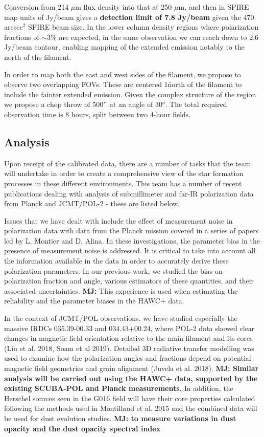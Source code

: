 \documentclass[11pt]{amsart}
\begin{document}
{Conversion from 214 $\mu$m flux density into that at 250 $\mu$m, and then in SPIRE map units of Jy/beam gives a {\bf detection limit of 7.8 Jy/beam}
given the 470 arcsec$^2$ SPIRE beam size.  In the lower column density regions where polarization fractions of $\sim3\%$ are expected, in the same
observation we can reach down to 2.6 Jy/beam contour, enabling mapping of the extended emission notably to the north of the filament.

In order to map both the east and west sides of the filament, we propose to observe two overlapping FOVs. These are centered 1\' north of the filament to include
the fainter extended emission. Given the complex structure of the region we propose a chop throw of 500$"$ at an angle of 30$^o$. 
The total required observation time is 8 hours, split between two 4-hour fields.


\subsection{Analysis}
Upon receipt of the calibrated data, there are a number of tasks that the team will undertake in order
to create a comprehensive view of the star formation processes in these different environments. This team has a number of recent publications dealing with analysis of submillimeter and far-IR polarization data from Planck and JCMT/POL-2 - these are listed below.

Issues that we have dealt with include the effect of measurement noise in polarization data with data from the Planck mission covered in a series of papers led by L. Montier and D. Alina.
In these investigations, the parameter bias in the presence of measurement noise is addressed. It is critical to take into account all the information available in the data in order to accurately derive these polarization parameters.  In our previous work, we studied the bias on polarization fraction and angle, various estimators of these quantities, and their associated uncertainties. {\bf MJ: }This experience is used when estimating the reliability and the parameter biases in the HAWC+ data.}

In the context of JCMT/POL observations, we have studied especially the massive IRDCs 035.39-00.33 and 034.43+00.24, where POL-2 data showed clear changes in magnetic field orientation relative to the main filament and its cores  (Liu et al. 2018, Soam et al 2019). 
Detailed 3D radiative transfer modelling was used to examine  how the polarization angles and fractions depend on potential magnetic field geometries and grain alignment (Juvela et al. 2018).
{\bf MJ: Similar analysis will be carried out using the HAWC+ data, supported by the existing SCUBA-POL and Planck measurements.}
In addition, the Herschel sources seen in the G016 field will have their core properties calculated following the methods used in Montillaud et al. 2015 and the combined data will be used for dust evolution studies.
{\bf MJ: to measure variations in dust opacity and the dust opacity spectral index}
\end{document}
